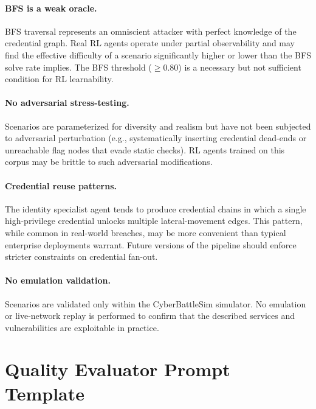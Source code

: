 \documentclass[11pt,a4paper]{article}
\newcommand{\CBS}{CyberBattleSim\xspace}
\begin{document}
\paragraph{BFS is a weak oracle.}
BFS traversal represents an omniscient attacker with perfect knowledge of the
credential graph.  Real RL agents operate under partial observability and may
find the effective difficulty of a scenario significantly higher or lower
than the BFS solve rate implies.  The BFS threshold ($\geq 0.80$) is a
necessary but not sufficient condition for RL learnability.

\paragraph{No adversarial stress-testing.}
Scenarios are parameterized for diversity and realism but have not been
subjected to adversarial perturbation (e.g., systematically inserting
credential dead-ends or unreachable flag nodes that evade static checks).
RL agents trained on this corpus may be brittle to such adversarial
modifications.

\paragraph{Credential reuse patterns.}
The identity specialist agent tends to produce credential chains in which a
single high-privilege credential unlocks multiple lateral-movement edges.
This pattern, while common in real-world breaches, may be more convenient
than typical enterprise deployments warrant.  Future versions of the pipeline
should enforce stricter constraints on credential fan-out.

\paragraph{No emulation validation.}
Scenarios are validated only within the \CBS simulator.  No emulation or
live-network replay is performed to confirm that the described services and
vulnerabilities are exploitable in practice.




\appendix

\section{Quality Evaluator Prompt Template}
\label{app:prompt}
\end{document}
